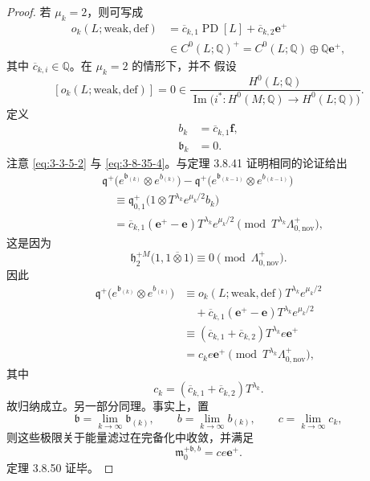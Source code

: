\begin{proof}
若 $\mu_k=2$，则可写成
\[
\begin{aligned}
o_k(L;\mathrm{weak,def})
&=\overline c_{k,1}\operatorname{PD}[L]
  +\overline c_{k,2}\mathbf e^+\\
&\in C^0(L;\mathbb Q)^+
 =C^0(L;\mathbb Q)\oplus\mathbb Q\mathbf e^+,
\end{aligned}
\]
其中 $\overline c_{k,i}\in\mathbb Q$。在 $\mu_k=2$ 的情形下，并不
假设
\[
 [o_k(L;\mathrm{weak,def})]
 =0
 \in
 \frac{H^0(L;\mathbb Q)}
 {\operatorname{Im}\bigl(
 i^*\colon H^0(M;\mathbb Q)\longrightarrow H^0(L;\mathbb Q)
 \bigr)}.
\]
定义
\begin{align}
 b_k&=\overline c_{k,1}\mathbf f,
\tag{3.8.53.1}\label{eq:3-8-53-1}\\
 \mathfrak b_k&=0.
\tag{3.8.53.2}\label{eq:3-8-53-2}
\end{align}
注意 \eqref{eq:3-3-5-2} 与 \eqref{eq:3-8-35-4}。与定理 3.8.41
证明相同的论证给出
\[
\begin{aligned}
&\mathfrak q^+\bigl(
 e^{\mathfrak b_{(k)}}\otimes e^{b_{(k)}}
 \bigr)
 -
 \mathfrak q^+\bigl(
 e^{\mathfrak b_{(k-1)}}\otimes e^{b_{(k-1)}}
 \bigr)\\
&\quad\equiv
 \mathfrak q^+_{0,1}
 \bigl(1\otimes T^{\lambda_k}e^{\mu_k/2}b_k\bigr)\\
&\quad=
 \overline c_{k,1}(\mathbf e^+-\mathbf e)
 T^{\lambda_k}e^{\mu_k/2}
 \pmod{T^{\lambda_k}\Lambda^+_{0,\mathrm{nov}}},
\end{aligned}
\]
这是因为
\[
 \mathfrak h_2^{+M}
 \bigl(1,1\mathbin{\overline\otimes}1\bigr)
 \equiv0\pmod{\Lambda^+_{0,\mathrm{nov}}}.
\]
因此
\[
\begin{aligned}
 \mathfrak q^+\bigl(
 e^{\mathfrak b_{(k)}}\otimes e^{b_{(k)}}
 \bigr)
&\equiv
o_k(L;\mathrm{weak,def})T^{\lambda_k}e^{\mu_k/2}\\
&\quad+
\overline c_{k,1}(\mathbf e^+-\mathbf e)
T^{\lambda_k}e^{\mu_k/2}\\
&\equiv
(\overline c_{k,1}+\overline c_{k,2})
T^{\lambda_k}e\mathbf e^+\\
&=c_ke\mathbf e^+
\pmod{T^{\lambda_k}\Lambda^+_{0,\mathrm{nov}}},
\end{aligned}
\]
其中
\[
 c_k=(\overline c_{k,1}+\overline c_{k,2})T^{\lambda_k}.
\]
故归纳成立。另一部分同理。事实上，置
\[
 \mathfrak b=\lim_{k\to\infty}\mathfrak b_{(k)},
 \qquad
 b=\lim_{k\to\infty}b_{(k)},
 \qquad
 c=\lim_{k\to\infty}c_k,
\]
则这些极限关于能量滤过在完备化中收敛，并满足
\[
 \mathfrak m_0^{+\mathfrak b,b}=ce\mathbf e^+.
\]
定理 3.8.50 证毕。
\end{proof}

